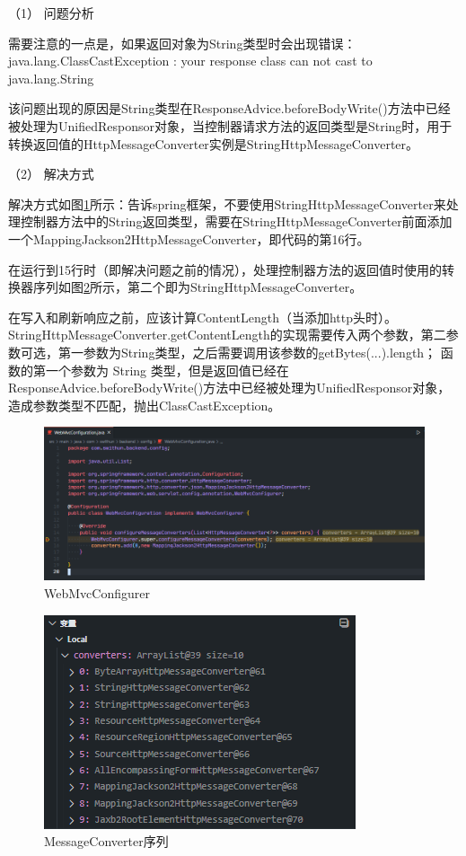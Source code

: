 （1） 问题分析

需要注意的一点是，如果返回对象为String类型时会出现错误：java.lang.ClassCastException :  your response class can not cast to java.lang.String

该问题出现的原因是String类型在ResponseAdvice.beforeBodyWrite()方法中已经被处理为UnifiedResponsor对象，当控制器请求方法的返回类型是String时，用于转换返回值的HttpMessageConverter实例是StringHttpMessageConverter。

（2） 解决方式

解决方式如图\ref{WebMvcConfigurer}所示：告诉spring框架，不要使用StringHttpMessageConverter来处理控制器方法中的String返回类型，需要在StringHttpMessageConverter前面添加一个MappingJackson2HttpMessageConverter，即代码的第16行。

在运行到15行时（即解决问题之前的情况），处理控制器方法的返回值时使用的转换器序列如图\ref{MessageConverter-list}所示，第二个即为StringHttpMessageConverter。

在写入和刷新响应之前，应该计算ContentLength（当添加http头时）。StringHttpMessageConverter.getContentLength的实现需要传入两个参数，第二参数可选，第一参数为String类型，之后需要调用该参数的getBytes(...).length； 函数的第一个参数为 String 类型，但是返回值已经在ResponseAdvice.beforeBodyWrite()方法中已经被处理为UnifiedResponsor对象，造成参数类型不匹配，抛出ClassCastException。

\begin{figure}[htbp]
  \centering
  \includegraphics[scale = 0.6]{out/figure/统一返回对象/WebMvcConfiguration-MessageConverter-Code.png}
  \caption{\song\wuhao WebMvcConfigurer}
  \label{WebMvcConfigurer}
\end{figure}

\begin{figure}[htbp]
  \centering
  \includegraphics[scale = 0.8]{out/figure/统一返回对象/WebMvcConfiguration-MessageConverter-debug.png}
  \caption{\song\wuhao MessageConverter序列}
  \label{MessageConverter-list}
\end{figure}

